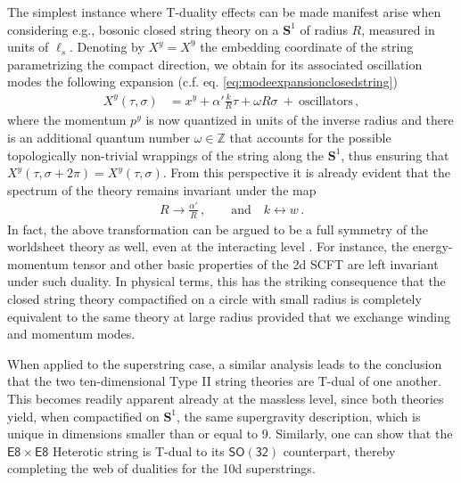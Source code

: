 The simplest instance where T-duality effects can be made manifest arise when considering e.g., bosonic closed string theory on a $\mathbf{S}^1$ of radius $R$, measured in units of $\ell_s$. Denoting by $X^y = X^9$ the embedding coordinate of the string parametrizing the compact direction, we obtain for its associated oscillation modes the following expansion (c.f. eq. \eqref{eq:modeexpansionclosedstring})
%
\begin{align}
	X^y (\tau, \sigma)& = x^{y} + \alpha' \frac{k}{R} \tau + \omega R \sigma\ +\ \text{oscillators}\, ,
\end{align}
%
where the momentum $p^y$ is now quantized in units of the inverse radius and there is an additional quantum number $\omega \in \mathbb{Z}$ that accounts for the possible topologically non-trivial wrappings of the string along the $\mathbf{S}^1$, thus ensuring that $X^y (\tau, \sigma + 2\pi) = X^y (\tau, \sigma)$. From this perspective it is already evident that the spectrum of the theory remains invariant under the map
%
\begin{align}\label{eq:Tdualtransf}
R\rightarrow \frac{\alpha'}{R} \, ,\qquad \text{and}\quad k\leftrightarrow w\, . 
\end{align} 
%
In fact, the above transformation can be argued to be a full symmetry of the worldsheet theory as well, even at the interacting level \cite{Ginsparg:1986wr}. For instance, the energy-momentum tensor and other basic properties of the 2d SCFT are left invariant under such duality. In physical terms, this has the striking consequence that the closed string theory compactified on a circle with small radius is completely equivalent to the same theory at large radius provided that we exchange winding and momentum modes.  

When applied to the superstring case, a similar analysis leads to the conclusion that the two ten-dimensional Type II string theories are T-dual of one another. This becomes readily apparent already at the massless level, since both theories yield, when compactified on $\mathbf{S}^1$, the same supergravity description, which is unique in dimensions smaller than or equal to 9. Similarly, one can show that the $\mathsf{E8}\times \mathsf{E8}$ Heterotic string is T-dual to its $\mathsf{SO(32)}$ counterpart, thereby completing the web of dualities for the 10d superstrings. 

